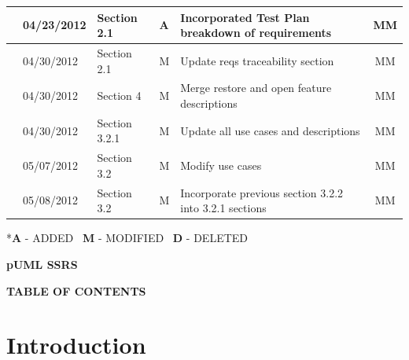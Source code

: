 \documentclass[twoside,letterpaper]{article}
\begin{document}
\begin{flushleft}
\begin{supertabular}[c]{|m{0.75in}|m{1.0in}|m{1.5in}|m{0.25in}|m{2in}|c|}
\\\hline
{}
& 04/23/2012
& Section 2.1
& \centering A
& Incorporated Test Plan breakdown of requirements
& MM

\\\hline
{}
& 04/30/2012
& Section 2.1 
& \centering M
& Update reqs traceability section 
& MM

\\\hline
{}
& 04/30/2012
& Section 4 
& \centering M
& Merge restore and open feature descriptions   
& MM

\\\hline
{}
& 04/30/2012
& Section 3.2.1
& \centering M
& Update all use cases and descriptions
& MM

\\\hline
{}
& 05/07/2012
& Section 3.2
& \centering M
& Modify use cases
& MM

\\\hline
{}
& 05/08/2012
& Section 3.2
& \centering M
& Incorporate previous section 3.2.2 into 3.2.1 sections
& MM


\\\hline
\end{supertabular}
\end{flushleft}


{ {*}{\textbf{A}}{ - ADDED \ }{\textbf{M}}{ - MODIFIED \ }{\textbf{D}}{ - DELETED}}






\clearpage

{\centering\bfseries
pUML SSRS
\par}

{\centering\bfseries
TABLE OF CONTENTS
\par}


\setcounter{tocdepth}{9}
\renewcommand\contentsname{}
\tableofcontents

\bigskip

\bigskip

\setcounter{page}{1}\pagestyle{Convertiv}





\clearpage\clearpage\setcounter{page}{1}\pagestyle{Convertii}
\section[Introduction]{\bfseries
Introduction}
\end{document}
